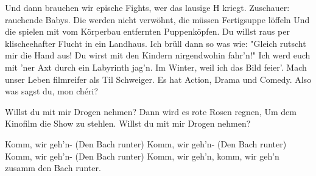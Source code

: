 \begin{guitar}
	Und dann brauchen wir epische Fights, wer das lausige H kriegt.
	Zuschauer: rauchende Babys.
	Die werden nicht verwöhnt, die müssen Fertigsuppe löffeln
	Und die spielen mit vom Körperbau entfernten Puppenköpfen.
	Du willst raus per klischeehafter Flucht in ein Landhaus.
	Ich brüll dann so was wie: "Gleich rutscht mir die Hand aus!
	Du wirst mit den Kindern nirgendwohin fahr'n!"
	Ich werd euch mit 'ner Axt durch ein Labyrinth jag’n.
	Im Winter, weil ich das Bild feier'.
	Mach unser Leben filmreifer als Til Schweiger.
	Es hat Action, Drama und Comedy.
	Also was sagst du, mon chéri?
	
	Willst du mit mir Drogen nehmen?
	Dann wird es rote Rosen regnen,
	Um dem Kinofilm die Show zu stehlen.
	Willst du mit mir Drogen nehmen?
	
	 
	
	Komm, wir geh'n- (Den Bach runter)
	Komm, wir geh'n- (Den Bach runter)
	Komm, wir geh'n- (Den Bach runter)
	Komm, wir geh'n, komm, wir geh'n zusamm den Bach runter.
\end{guitar}

